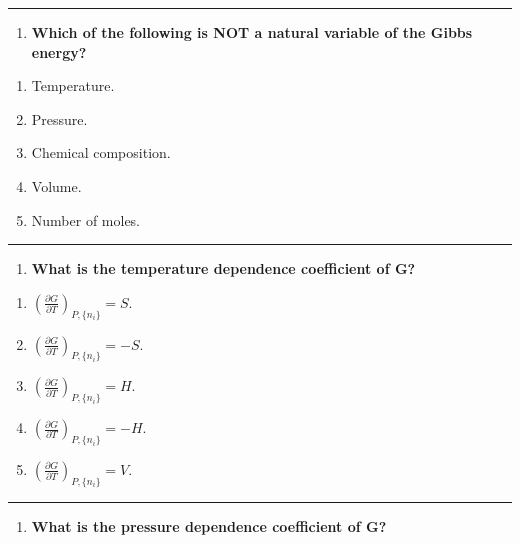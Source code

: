 \documentclass[
  9pt,
]{extbook}
\providecommand{\tightlist}{%
  \setlength{\itemsep}{0pt}\setlength{\parskip}{0pt}}
\theoremstyle{definition}
\theoremstyle{definition}
\theoremstyle{definition}
\theoremstyle{definition}
\theoremstyle{remark}
\begin{document}
\begin{center}\rule{0.5\linewidth}{0.5pt}\end{center}

\begin{enumerate}
\def\labelenumi{\arabic{enumi}.}
\setcounter{enumi}{2}
\tightlist
\item
  \textbf{Which of the following is NOT a natural variable of the Gibbs energy?}
\end{enumerate}

\begin{enumerate}
\def\labelenumi{\alph{enumi}.}
\tightlist
\item
  Temperature.
\item
  Pressure.
\item
  Chemical composition.
\item
  Volume.
\item
  Number of moles.
\end{enumerate}

\begin{center}\rule{0.5\linewidth}{0.5pt}\end{center}

\begin{enumerate}
\def\labelenumi{\arabic{enumi}.}
\setcounter{enumi}{3}
\tightlist
\item
  \textbf{What is the temperature dependence coefficient of G?}
\end{enumerate}

\begin{enumerate}
\def\labelenumi{\alph{enumi}.}
\tightlist
\item
  \(\left(\frac{\partial G}{\partial T}\right)_{P,\{n_i\}} = S\).
\item
  \(\left(\frac{\partial G}{\partial T}\right)_{P,\{n_i\}} = -S\).
\item
  \(\left(\frac{\partial G}{\partial T}\right)_{P,\{n_i\}} = H\).
\item
  \(\left(\frac{\partial G}{\partial T}\right)_{P,\{n_i\}} = -H\).
\item
  \(\left(\frac{\partial G}{\partial T}\right)_{P,\{n_i\}} = V\).
\end{enumerate}

\begin{center}\rule{0.5\linewidth}{0.5pt}\end{center}

\begin{enumerate}
\def\labelenumi{\arabic{enumi}.}
\setcounter{enumi}{4}
\tightlist
\item
  \textbf{What is the pressure dependence coefficient of G?}
\end{enumerate}
\end{document}
